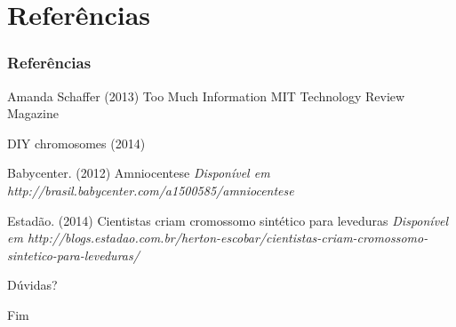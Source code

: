 \documentclass{beamer}
\begin{document}
\section{Referências}


\begin{frame}
\frametitle{Referências}
\footnotesize{
\begin{thebibliography}{9} 

 Amanda Schaffer (2013)
\newblock Too Much Information
\newblock MIT Technology Review Magazine

 DIY chromosomes (2014)

 Babycenter. (2012)
\newblock Amniocentese
\newblock \emph{Disponível em http://brasil.babycenter.com/a1500585/amniocentese}

 Estadão. (2014)
\newblock Cientistas criam cromossomo sintético para leveduras
\newblock \emph{Disponível em http://blogs.estadao.com.br/herton-escobar/cientistas-criam-cromossomo-sintetico-para-leveduras/}

\end{thebibliography}
}
\end{frame}


\begin{frame}
\Huge{\centerline{Dúvidas?}}
\end{frame}


\begin{frame}
\Huge{\centerline{Fim}}
\end{frame}

\end{document}
